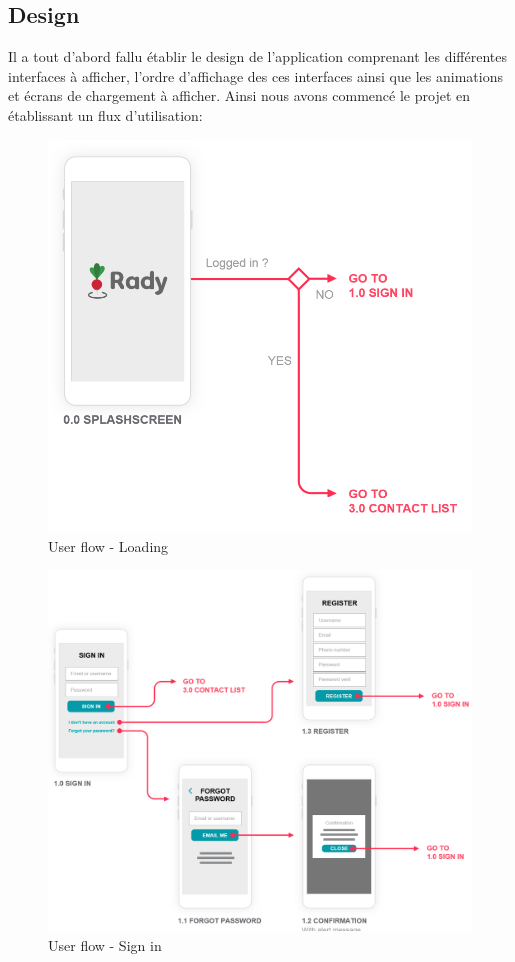 \documentclass[french]{article}
\begin{document}
	\subsection{Design}
	
	Il a tout d'abord fallu établir le design de l'application comprenant les différentes interfaces à afficher, l'ordre d'affichage des ces interfaces ainsi que les animations et écrans de chargement à afficher. Ainsi nous avons commencé le projet en établissant un flux d'utilisation:
	
	\begin{figure}[H]
		\centering
		\includegraphics[scale=0.6]{../user-flow/user-flow-1.png}
		\caption{User flow - Loading}
		\label{User flow - Loading}
	\end{figure}
	
	\begin{figure}[H]
		\centering
		\includegraphics[scale=0.6]{../user-flow/user-flow-2.png}
		\caption{User flow - Sign in}
		\label{User flow - Sign in}
	\end{figure}
	
\end{document}
